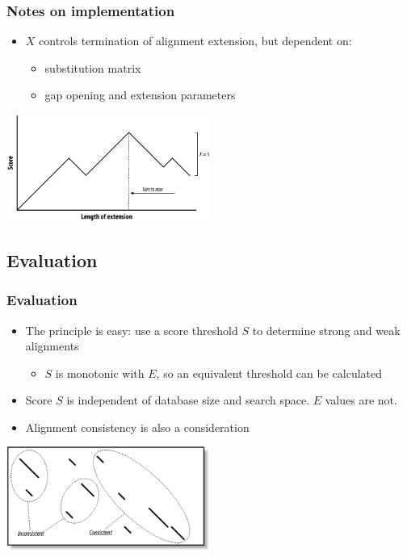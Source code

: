 \documentclass[table]{beamer}
\begin{document}
  \begin{frame}
    \frametitle{Notes on implementation}
    \begin{itemize}
      \item $X$ controls termination of alignment extension, but dependent on:
      \begin{itemize}
        \item substitution matrix
        \item gap opening and extension parameters
      \end{itemize}
    \end{itemize}
    \begin{center}
      \includegraphics[width=0.5\textwidth]{images/extension} 
    \end{center}    
  \end{frame}

  \subsection{Evaluation}
  \begin{frame}
    \frametitle{Evaluation}
    \begin{itemize}
      \item The principle is easy: use a score threshold $S$ to determine strong and weak alignments
      \begin{itemize}
        \item $S$ is monotonic with $E$, so an equivalent threshold can be calculated
      \end{itemize}
      \item Score $S$ is independent of database size and search space. $E$ values are not.
      \item Alignment consistency is also a consideration
    \end{itemize}
    \begin{center}
      \includegraphics[width=0.5\textwidth]{images/consistency} 
    \end{center}    
  \end{frame}
\end{document}
